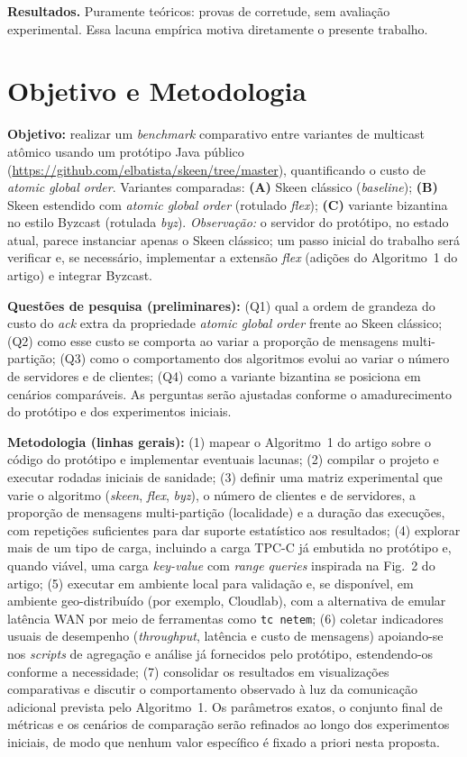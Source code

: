 \documentclass[10pt,a4paper]{article}
\begin{document}
\textbf{Resultados.} Puramente teóricos: provas de corretude, sem avaliação experimental. Essa lacuna empírica motiva diretamente o presente trabalho.

\section{Objetivo e Metodologia}
\textbf{Objetivo:} realizar um \textit{benchmark} comparativo entre variantes de multicast atômico usando um protótipo Java público (\url{https://github.com/elbatista/skeen/tree/master}), quantificando o custo de \textit{atomic global order}. Variantes comparadas: \textbf{(A)} Skeen clássico (\textit{baseline}); \textbf{(B)} Skeen estendido com \textit{atomic global order} (rotulado \textit{flex}); \textbf{(C)} variante bizantina no estilo Byzcast (rotulada \textit{byz}). \textit{Observação:} o servidor do protótipo, no estado atual, parece instanciar apenas o Skeen clássico; um passo inicial do trabalho será verificar e, se necessário, implementar a extensão \textit{flex} (adições do Algoritmo~1 do artigo) e integrar Byzcast.

\textbf{Questões de pesquisa (preliminares):} (Q1) qual a ordem de grandeza do custo do \textit{ack} extra da propriedade \textit{atomic global order} frente ao Skeen clássico; (Q2) como esse custo se comporta ao variar a proporção de mensagens multi-partição; (Q3) como o comportamento dos algoritmos evolui ao variar o número de servidores e de clientes; (Q4) como a variante bizantina se posiciona em cenários comparáveis. As perguntas serão ajustadas conforme o amadurecimento do protótipo e dos experimentos iniciais.

\textbf{Metodologia (linhas gerais):} (1) mapear o Algoritmo~1 do artigo sobre o código do protótipo e implementar eventuais lacunas; (2) compilar o projeto e executar rodadas iniciais de sanidade; (3) definir uma matriz experimental que varie o algoritmo (\textit{skeen}, \textit{flex}, \textit{byz}), o número de clientes e de servidores, a proporção de mensagens multi-partição (localidade) e a duração das execuções, com repetições suficientes para dar suporte estatístico aos resultados; (4) explorar mais de um tipo de carga, incluindo a carga TPC-C já embutida no protótipo e, quando viável, uma carga \textit{key-value} com \textit{range queries} inspirada na Fig.~2 do artigo; (5) executar em ambiente local para validação e, se disponível, em ambiente geo-distribuído (por exemplo, Cloudlab), com a alternativa de emular latência WAN por meio de ferramentas como \texttt{tc netem}; (6) coletar indicadores usuais de desempenho (\textit{throughput}, latência e custo de mensagens) apoiando-se nos \textit{scripts} de agregação e análise já fornecidos pelo protótipo, estendendo-os conforme a necessidade; (7) consolidar os resultados em visualizações comparativas e discutir o comportamento observado à luz da comunicação adicional prevista pelo Algoritmo~1. Os parâmetros exatos, o conjunto final de métricas e os cenários de comparação serão refinados ao longo dos experimentos iniciais, de modo que nenhum valor específico é fixado a priori nesta proposta.
\end{document}
